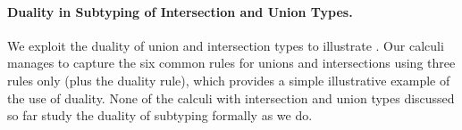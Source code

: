 \paragraph*{Duality in Subtyping of Intersection and Union Types.}
We exploit the duality of union and intersection 
types to illustrate \nameduo.
Our \nameduo calculi manages to capture the six common 
rules for unions and intersections
using three rules only (plus the duality rule), which provides a simple 
illustrative example of the use of duality.
None of the calculi with intersection and union types discussed so far
study the duality of subtyping formally as we do.




